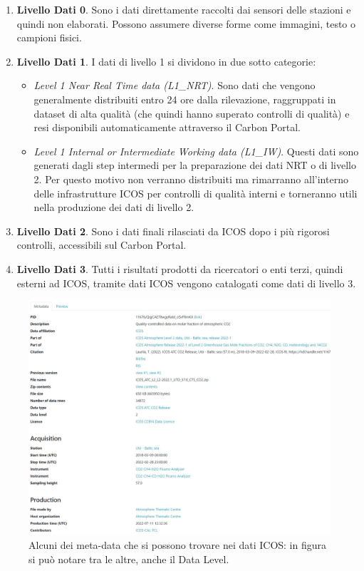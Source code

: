 \begin{enumerate}
    \item \textbf{Livello Dati 0}. Sono i dati direttamente raccolti dai sensori delle stazioni e quindi non elaborati. Possono assumere diverse forme come immagini, testo o campioni fisici.
    \item \textbf{Livello Dati 1}. I dati di livello 1 si dividono in due sotto categorie:
        \begin{itemize}
            \item \textit{Level 1 Near Real Time data (L1\_NRT)}. Sono dati che 
            vengono generalmente distribuiti entro 24 ore dalla rilevazione,
            raggruppati in dataset di alta qualità (che quindi hanno superato
            controlli di qualità) e resi disponibili automaticamente attraverso
            il Carbon Portal.  
            \item \textit{Level 1 Internal or Intermediate Working data (L1\_IW)}.
            Questi dati sono generati dagli step intermedi per la preparazione dei dati
            NRT o di livello 2. Per questo motivo non verranno distribuiti ma rimarranno
            all'interno delle infrastrutture ICOS per controlli di qualità interni
            e torneranno utili nella produzione dei dati di livello 2.
        \end{itemize} 
    \item \textbf{Livello Dati 2}. Sono i dati finali rilasciati da ICOS dopo i più rigorosi
    controlli, accessibili sul Carbon Portal.
    \item \textbf{Livello Dati 3}. Tutti i risultati prodotti da ricercatori o enti
    terzi, quindi esterni ad ICOS, tramite dati ICOS vengono catalogati come dati di livello 3.
\end{enumerate}

\begin{figure}[h!]
    \centering
    \includegraphics[height=0.36\textwidth]{figures/metaEx.JPG}
    \caption{Alcuni dei meta-data che si possono trovare nei dati ICOS: in figura si può notare tra le altre, anche il Data Level.}
    \label{figure:metadata-ex}
\end{figure}